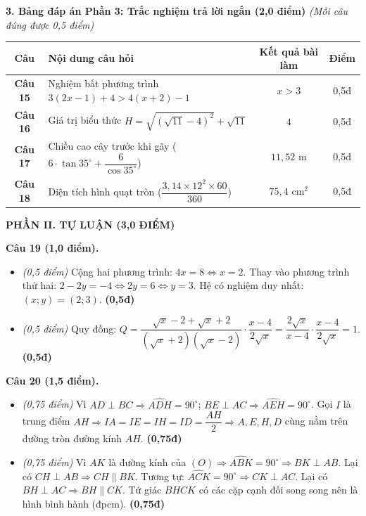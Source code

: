 \documentclass[11pt,a4paper]{article}
\begin{document}
\vspace{2mm}
\noindent
\textbf{3. Bảng đáp án Phần 3: Trắc nghiệm trả lời ngắn (2,0 điểm)} \textit{(Mỗi câu đúng được 0,5 điểm)}
\begin{center}
\begin{tabular}{|c|l|c|c|}
\hline
\textbf{Câu} & \textbf{Nội dung câu hỏi} & \textbf{Kết quả bài làm} & \textbf{Điểm} \\
\hline
\textbf{Câu 15} & Nghiệm bất phương trình $3(2x - 1) + 4 > 4(x + 2) - 1$ & \textbf{$x > 3$} & 0,5đ \\
\hline
\textbf{Câu 16} & Giá trị biểu thức $H = \sqrt{(\sqrt{11}-4)^2} + \sqrt{11}$ & \textbf{$4$} & 0,5đ \\
\hline
\textbf{Câu 17} & Chiều cao cây trước khi gãy ($6 \cdot \tan 35^\circ + \dfrac{6}{\cos 35^\circ}$) & \textbf{$11{,}52\text{ m}$} & 0,5đ \\
\hline
\textbf{Câu 18} & Diện tích hình quạt tròn ($\dfrac{3{,}14 \times 12^2 \times 60}{360}$) & \textbf{$75{,}4\text{ cm}^2$} & 0,5đ \\
\hline
\end{tabular}
\end{center}

\vspace{3mm}
\noindent
\textbf{\large PHẦN II. TỰ LUẬN (3,0 ĐIỂM)}

\vspace{2mm}
\textbf{Câu 19 (1,0 điểm).}
\begin{itemize}
  \item[a)] \textit{(0,5 điểm)} Cộng hai phương trình: $4x = 8 \Leftrightarrow x = 2$. Thay vào phương trình thứ hai: $2 - 2y = -4 \Leftrightarrow 2y = 6 \Leftrightarrow y = 3$. Hệ có nghiệm duy nhất: $(x; y) = (2; 3)$. \hfill \textbf{(0,5đ)}
  \item[b)] \textit{(0,5 điểm)} Quy đồng: $Q = \dfrac{\sqrt{x}-2+\sqrt{x}+2}{(\sqrt{x}+2)(\sqrt{x}-2)} \cdot \dfrac{x-4}{2\sqrt{x}} = \dfrac{2\sqrt{x}}{x-4} \cdot \dfrac{x-4}{2\sqrt{x}} = 1$. \hfill \textbf{(0,5đ)}
\end{itemize}

\vspace{1mm}
\textbf{Câu 20 (1,5 điểm).}
\begin{itemize}
  \item[a)] \textit{(0,75 điểm)} Vì $AD \perp BC \Rightarrow \widehat{ADH} = 90^\circ$; $BE \perp AC \Rightarrow \widehat{AEH} = 90^\circ$. Gọi $I$ là trung điểm $AH \Rightarrow IA = IE = IH = ID = \dfrac{AH}{2} \Rightarrow A, E, H, D$ cùng nằm trên đường tròn đường kính $AH$. \hfill \textbf{(0,75đ)}
  \item[b)] \textit{(0,75 điểm)} Vì $AK$ là đường kính của $(O) \Rightarrow \widehat{ABK} = 90^\circ \Rightarrow BK \perp AB$. Lại có $CH \perp AB \Rightarrow CH \parallel BK$. Tương tự: $\widehat{ACK} = 90^\circ \Rightarrow CK \perp AC$. Lại có $BH \perp AC \Rightarrow BH \parallel CK$. Tứ giác $BHCK$ có các cặp cạnh đối song song nên là hình bình hành (đpcm). \hfill \textbf{(0,75đ)}
\end{itemize}
\end{document}
